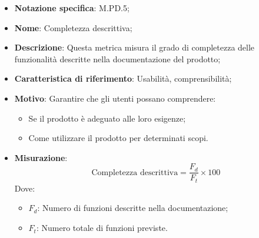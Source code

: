 \begin{itemize}
    \item \textbf{Notazione specifica}: M.PD.5;
    \item \textbf{Nome}: Completezza descrittiva;
    \item \textbf{Descrizione}: Questa metrica misura il grado di completezza delle funzionalità descritte nella documentazione del prodotto;
    \item \textbf{Caratteristica di riferimento}: Usabilità, comprensibilità;
    \item \textbf{Motivo}: Garantire che gli utenti possano comprendere:
    \begin{itemize}
        \item Se il prodotto è adeguato alle loro esigenze;
        \item Come utilizzare il prodotto per determinati scopi.
    \end{itemize}
    \item \textbf{Misurazione}:
    \[
    \text{Completezza descrittiva} = \frac{F_{d}}{F_{t}} \times 100
    \]
    Dove:
    \begin{itemize}
        \item $F_{d}$: Numero di funzioni descritte nella documentazione;
        \item $F_{t}$: Numero totale di funzioni previste.
    \end{itemize}
\end{itemize}
